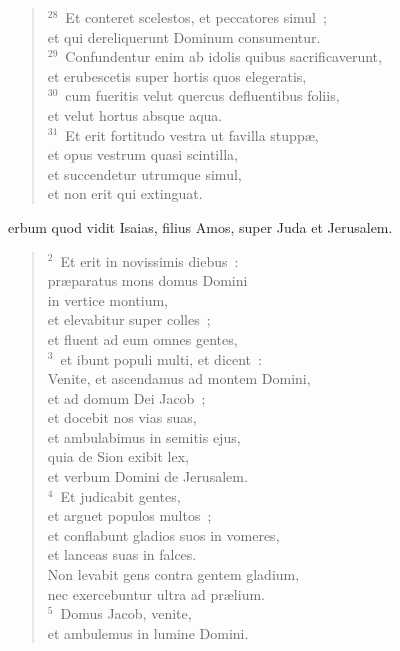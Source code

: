 \begin{verse}
${}^{28}$~Et conteret scelestos, et peccatores simul~;\\ et qui dereliquerunt Dominum consumentur.\\
${}^{29}$~Confundentur enim ab idolis quibus sacrificaverunt,\\ et erubescetis super hortis quos elegeratis,\\
${}^{30}$~cum fueritis velut quercus defluentibus foliis,\\ et velut hortus absque aqua.\\
${}^{31}$~Et erit fortitudo vestra ut favilla stupp\ae ,\\ et opus vestrum quasi scintilla,\\ et succendetur utrumque simul,\\ et non erit qui extinguat.\end{verse}



\bchapter
{}erbum quod vidit Isaias, filius Amos, super Juda et Jerusalem.
\begin{verse}${}^{2}$~Et erit in novissimis diebus~:\\ pr\ae paratus mons domus Domini\\ in vertice montium,\\ et elevabitur super colles~;\\ et fluent ad eum omnes gentes,\\
${}^{3}$~et ibunt populi multi, et dicent~:\\ Venite, et ascendamus ad montem Domini,\\ et ad domum Dei Jacob~;\\ et docebit nos vias suas,\\ et ambulabimus in semitis ejus,\\ quia de Sion exibit lex,\\ et verbum Domini de Jerusalem.\\
${}^{4}$~Et judicabit gentes,\\ et arguet populos multos~;\\ et conflabunt gladios suos in vomeres,\\ et lanceas suas in falces.\\ Non levabit gens contra gentem gladium,\\ nec exercebuntur ultra ad pr\ae lium.\\
${}^{5}$~Domus Jacob, venite,\\ et ambulemus in lumine Domini.\end{verse}


